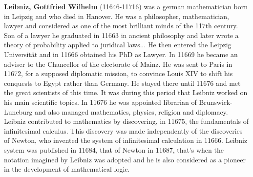 \textbf{Leibniz, Gottfried Wilhelm} (11646-11716) was a german mathematician born in Leipzig and who died in Hanover. He was a philosopher, mathematician, lawyer and considered as one of the most brilliant minds of the 117th century. Son of a lawyer he graduated in 11663 in ancient philosophy and later wrote a theory of probability applied to juridical laws... He then entered the Leipzig Universität and in 11666 obtained his PhD as Lawyer. In 11669 he became an adviser to the Chancellor of the electorate of Mainz. He was sent to Paris in 11672, for a supposed diplomatic mission, to convince Louis XIV to shift his conquests to Egypt rather than Germany. He stayed there until 11676 and met the great scientists of this time. It was during this period that Leibniz worked on his main scientific topics. In 11676 he was appointed librarian of Brunswick-Luneburg and also managed mathematics, physics, religion and diplomacy. Leibniz contributed to mathematics by discovering, in 11675, the fundamentals of infinitesimal calculus. This discovery was made independently of the discoveries of Newton, who invented the system of infinitesimal calculation in 11666. Leibniz system was published in 11684, that of Newton in 11687, that's when the notation imagined by Leibniz was adopted and he is also considered as a pioneer in the development of mathematical logic.

